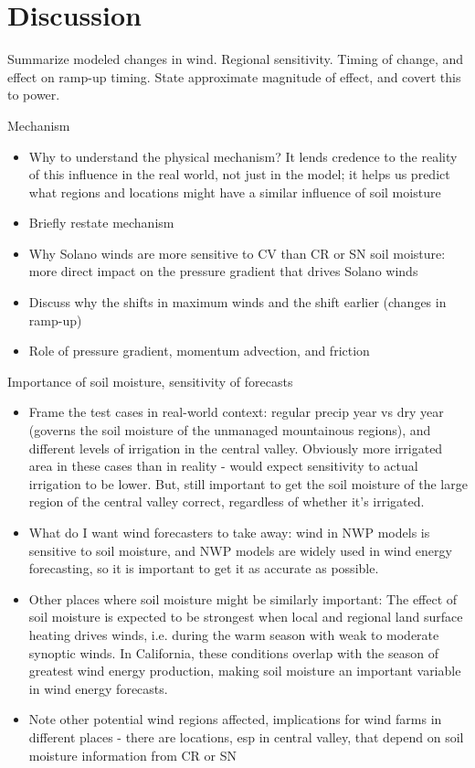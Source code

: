 
\section{Discussion}

Summarize modeled changes in wind.  Regional sensitivity.  Timing of change, and effect on ramp-up timing.  State approximate magnitude of effect, and covert this to power.

Mechanism
\begin{itemize}
\item Why to understand the physical mechanism?  It lends credence to the reality of this influence in the real world, not just in the model; it helps us predict what regions and locations might have a similar influence of soil moisture
\item Briefly restate mechanism
\item Why Solano winds are more sensitive to CV than CR or SN soil moisture: more direct impact on the pressure gradient that drives Solano winds
\item Discuss why the shifts in maximum winds and the shift earlier (changes in ramp-up)
\item Role of pressure gradient, momentum advection, and friction
\end{itemize}

Importance of soil moisture, sensitivity of forecasts
\begin{itemize}
\item Frame the test cases in real-world context: regular precip year vs dry year (governs the soil moisture of the unmanaged mountainous regions), and different levels of irrigation in the central valley.  Obviously more irrigated area in these cases than in reality - would expect sensitivity to actual irrigation to be lower.  But, still important to get the soil moisture of the large region of the central valley correct, regardless of whether it's irrigated.
\item What do I want wind forecasters to take away: wind in NWP models is sensitive to soil moisture, and NWP models are widely used in wind energy forecasting, so it is important to get it as accurate as possible.  
\item Other places where soil moisture might be similarly important: The effect of soil moisture is expected to be strongest when local and regional land surface heating drives winds, i.e. during the warm season with weak to moderate synoptic winds.  In California, these conditions overlap with the season of greatest wind energy production, making soil moisture an important variable in wind energy forecasts.
\item Note other potential wind regions affected, implications for wind farms in different places - there are locations, esp in central valley, that depend on soil moisture information from CR or SN
\end{itemize}

